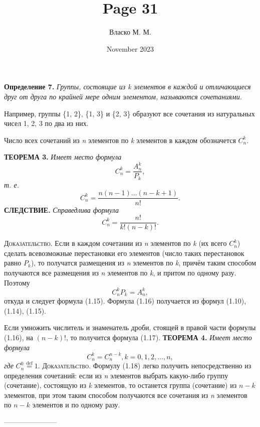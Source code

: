 \documentclass{article}
\title{Page 31}
\author{Власко М. М.}
\date{November 2023}
\begin{document}
{\setlength{\parindent}{0cm}
\textsf{\textbf{Определение 7.}}
\textit{Группы, состоящие из k элементов в каждой и отличающиеся друг от друга по крайней мере одним элементом, называются сочетаниями.}
}

Например, группы \{1, 2\}, \{1, 3\} и \{2, 3\} образуют все сочетания из натуральных чисел 1, 2, 3 по два из них.

Число всех сочетаний из \textit{n} элементов по \textit{k} элементов в каждом обозначется \(C_n^k\).


{\setlength{\parindent}{0cm}
   \textsc{\textbf{ТЕОРЕМА 3. }}\textit{Имеет место формула}
}
\[ C_n^k = \frac{A_n^k}{P_k}, \tag{1.15}\]
{\setlength{\parindent}{0cm}
   \textit{т. е.}
}
\[ C_n^k = \frac{n(n - 1)...(n - k + 1)}{n!}. \tag{1.16}\]
{\setlength{\parindent}{0cm}
   \textsc{\textbf{СЛЕДСТВИЕ. }}\textit{Справедлива формула}
}
\[ C_n^k = \frac{n!}{k!(n - k)!}. \tag{1.17}\]

{\setlength{\parindent}{0cm}
   \textsc{Доказательство.}
Если в каждом сочетании из \textit{n} элементов по \textit{k} (их всего \(C_n^k\)) сделать всевозможные перестановки
   его элементов (число таких перестановок равно \(P_k\)), то получатся размещения из \textit{n} элементов по
   \textit{k}, причём таким способом получаются все размещения из \textit{n} элементов по \textit{k}, и притом по
   одному разу. Поэтому \[ C_n^kP_k = A_n^k,\] откуда и следует формула (1.15).
   Формула (1.16) получается из формул
   (1.10), (1.14), (1.15).
}
\par{Если умножить числитель и знаменатель дроби, стоящей в правой части формулы (1.16), на \((n - k)\)!, то
получится формула (1.17).}
{\setlength{\parindent}{0cm}
   \textsc{\textbf{ТЕОРЕМА 4. }}\textit{Имеет место формула}
   \[ C_n^k = C_n^{n - k}, k = 0, 1, 2, \dots, n, \tag{1.18}\]
\textit{где} \(C_n^0 \stackrel{\text{def}}{=} 1\).
}
\newline
{\setlength{\parindent}{0cm}
   \textsc{\textsf{Доказательство.}}
Формулу (1.18) легко получить непосредственно из определения сочетаний: если из \textit{n} элементов выбрать какую-либо
   группу (сочетание), состоящую из \textit{k} элементов, то останется группа (сочетание) из \(n - k\) элементов, при
   этом таким способом получаются все сочетания из \textit{n} элементов по \(n - k\) элементов и по одному разу.
}

\centering
-----------------------
\end{document}
